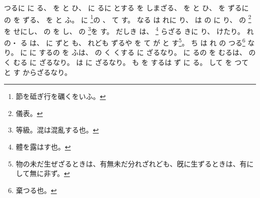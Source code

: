 \documentclass[a4paper,12pt]{article}
\begin{document}
\begin{quoting}
つるに%
に%
る、%
を%
と%
ひ、%
に%
るに%
とする%
を%
しまざる、%
を%
と%
ひ、%
を%
ずるに%
の%
を%
ずる、%
を%
と%
ふ。%
に%
\footnote{節を砥ぎ行を礪くをいふ。}の%
、%
%
て%
す。%
なる%
は%
れに%
り、%
は%
の%
に%
り、%
の%
\footnote{儀表。}を%
せにし、%
の%
を%
し、%
の%
\footnote{等級。混は混亂する也。}を%
す。%
だしき%
は、%
\footnote{體を露はす也。}%
%
らざる%
%
きに%
り、%
%
%
けたり。%
れ%
の・%
%
る%
は、%
に%
ずと%
も、%
れども%
%
ずるや%
を%
て%
が%
と%
す\footnote{物の未だ生ぜざるときは、有無未だ分れざれども、旣に生ずるときは、有にして無に非ず。}。%
ち%
は%
れ%
の%
つる\footnote{棄つる也。}%
なり。%
に%
に%
するの%
を%
ふは、%
の%
く%
くする%
に%
ざるなり。%
に%
るの%
を%
むるは、%
の%
く%
むる%
に%
ざるなり。%
は%
に%
ざるなり。%
も%
を%
するは%
ず%
に%
る。%
して%
を%
つて%
と%
す%
からざるなり。%

\end{quoting}
\end{document}

